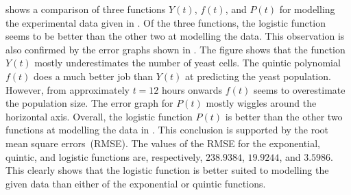 \documentclass[a4paper,oneside,12pt]{article}
\begin{document}
\begin{problem}
{\begin{solution}
 shows a comparison of three
functions $Y(t)$, $f(t)$, and $P(t)$ for modelling the experimental
data given in .  Of the three functions, the logistic
function seems to be better than the other two at modelling the data.
This observation is also confirmed by the error graphs shown in
.  The figure shows that the function
$Y(t)$ mostly underestimates the number of yeast cells.  The quintic
polynomial $f(t)$ does a much better job than $Y(t)$ at predicting the
yeast population.  However, from approximately $t = 12$ hours onwards
$f(t)$ seems to overestimate the population size.  The error graph for
$P(t)$ mostly wiggles around the horizontal axis.  Overall, the
logistic function $P(t)$ is better than the other two functions at
modelling the data in .  This conclusion is supported
by the root mean square errors~(RMSE).  The values of the RMSE for the
exponential, quintic, and logistic functions are, respectively,
$238.9384$, $19.9244$, and $3.5986$.  This clearly shows that the
logistic function is better suited to modelling the given data than
either of the exponential or quintic functions.
\end{solution}
}{}


\end{problem}
\end{document}
